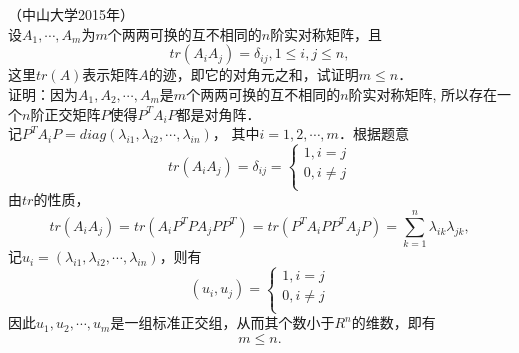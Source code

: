 \documentclass{article}
\begin{document}
\\ \\ （中山大学2015年）
\\ 设$A_1,\cdots,A_m$为$m$个两两可换的互不相同的$n$阶实对称矩阵，且
$$tr(A_i A_j)=\delta_{ij},1\leq i,j\leq n,$$
这里$tr(A)$表示矩阵$A$的迹，即它的对角元之和，试证明$m\leq n$．
\\ 证明：因为$A_1,A_2,\cdots,A_m$是$m$个两两可换的互不相同的$n$阶实对称矩阵,
所以存在一个$n$阶正交矩阵$P$使得${P^T}{A_i}P$都是对角阵．
\\ 记${P^T}{A_i}P=diag(\lambda_{i1},\lambda_{i2},\cdots,\lambda_{in})$，
其中$i=1,2,\cdots,m$．根据题意
$$
    tr(A_i A_j)=\delta_{ij}=
    \left\{
    \begin{array}{ccc}
        1,i=j     \\
        0,i\neq j \\
    \end{array}
    \right.
$$
由$tr$的性质，
$$tr(A_i A_j)=tr({A_i}{P^T}P{A_j}P{P^T})=tr({P^T}{A_i}P{P^T}{A_j}P)=\sum\limits_{k=1}^{n}\lambda_{ik}\lambda_{jk},$$
记$u_i=(\lambda_{i1},\lambda_{i2},\cdots,\lambda_{in})$，则有
$$
    (u_i,u_j)=
    \left\{
    \begin{array}{ccc}
        1,i=j     \\
        0,i\neq j \\
    \end{array}
    \right.
$$
因此$u_1,u_2,\cdots,u_m$是一组标准正交组，从而其个数小于$R^n$的维数，即有
$$m\leq n.$$
\end{document}
